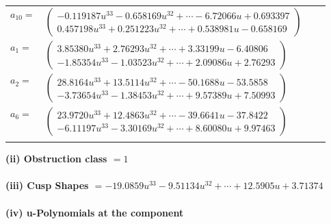 \documentclass[1p]{elsarticle_modified}
\theoremstyle{definition}
\begin{document}
\begin{tabular}{m{7pt} m{180pt} m{7pt} m{180pt} }
\flushright $a_{10}=$&$\begin{pmatrix}-0.119187 u^{33}-0.658169 u^{32}+\cdots-6.72066 u+0.693397\\0.457198 u^{33}+0.251223 u^{32}+\cdots+0.538981 u-0.658169\end{pmatrix}$ \\
\flushright $a_{1}=$&$\begin{pmatrix}3.85380 u^{33}+2.76293 u^{32}+\cdots+3.33199 u-6.40806\\-1.85354 u^{33}-1.03523 u^{32}+\cdots+2.09086 u+2.76293\end{pmatrix}$ \\
\flushright $a_{2}=$&$\begin{pmatrix}28.8164 u^{33}+13.5114 u^{32}+\cdots-50.1688 u-53.5858\\-3.73654 u^{33}-1.38453 u^{32}+\cdots+9.57389 u+7.50993\end{pmatrix}$ \\
\flushright $a_{6}=$&$\begin{pmatrix}23.9720 u^{33}+12.4863 u^{32}+\cdots-39.6641 u-37.8422\\-6.11197 u^{33}-3.30169 u^{32}+\cdots+8.60080 u+9.97463\end{pmatrix}$\\&\end{tabular}
\flushleft \textbf{(ii) Obstruction class $= 1$}\\~\\
\flushleft \textbf{(iii) Cusp Shapes $= -19.0859 u^{33}-9.51134 u^{32}+\cdots+12.5905 u+3.71374$}\\~\\
\newpage\renewcommand{\arraystretch}{1}
\flushleft \textbf{(iv) u-Polynomials at the component}\newline \\
\end{document}
